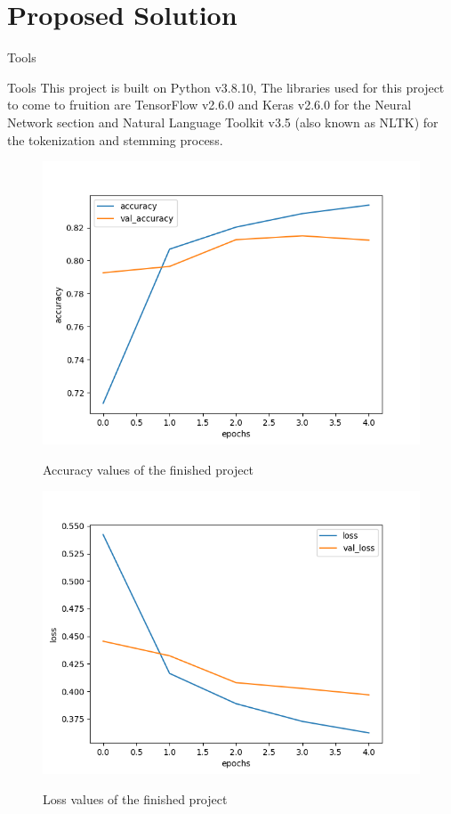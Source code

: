 \documentclass[11pt]{beamer}
\begin{document}
\section{Proposed Solution}
\begin{frame}{Tools}
	\begin{block}{Tools}
		This project is built on Python v3.8.10, The libraries used for this project to come to fruition are TensorFlow v2.6.0 and Keras v2.6.0 for the Neural Network section and Natural Language Toolkit v3.5 (also known as NLTK) for the tokenization and stemming process.
	\end{block}
\end{frame}
\begin{frame}
	\begin{multicols}{2} 
		\begin{figure}[!h]
		\centering
		\includegraphics[scale=.35]{Accuracy_Exp9}
		\label{fig:AccExp9}
		\caption{Accuracy values of the finished 	project}
		\end{figure}
		\begin{figure}[!h]
		\centering
		\includegraphics[scale=.35]{Loss_Exp9}
		\label{fig:LossExp9}
		\caption{Loss values of the finished 	project}
		\end{figure}
	\end{multicols}
\end{frame}
\end{document}
